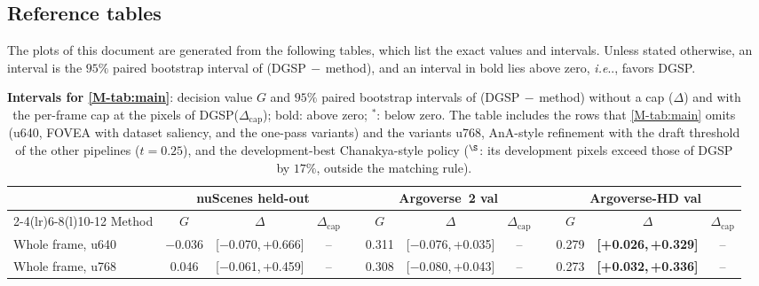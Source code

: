 \documentclass[10pt,letterpaper]{article}
\makeatletter
\DeclareRobustCommand\onedot{\futurelet\@let@token\@onedot}
\def\@onedot{\ifx\@let@token.\else.\null\fi\xspace}
\def\ie{\emph{i.e}\onedot} \def\Ie{\emph{I.e}\onedot}
\newcommand{\method}{DGSP\xspace}
\newcommand{\G}{G}
\newcommand{\ci}[2]{[#1,\allowbreak\,#2]}
\newcommand{\best}[1]{\textbf{#1}}
\newcommand{\na}{--}
\newcommand{\sw}{$^{\ast}$}   %
\theoremstyle{remark}
\theoremstyle{plain}
\theoremstyle{definition}
\makeatother
\begin{document}
\begin{landscape}
\section{Reference tables}
\label{sec:supp_reference}

The plots of this document are generated from the following tables, which list the exact values and intervals.
Unless stated otherwise, an interval is the $95\%$ paired bootstrap interval of (\method$\,-\,$method), and an interval in bold lies above zero, \ie, favors \method.

\begin{table}[!h]
\centering
\caption{\textbf{Intervals for \cref*{M-tab:main}}: decision value $\G$ and $95\%$ paired bootstrap intervals of (\method$\,-\,$method) without a cap ($\Delta$) and with the per-frame cap at the pixels of \method ($\Delta_{\mathrm{cap}}$); bold: above zero; \sw: below zero. The table includes the rows that \cref*{M-tab:main} omits (u640, FOVEA with dataset saliency, and the one-pass variants) and the variants u768, AnA-style refinement with the draft threshold of the other pipelines ($t=0.25$), and the development-best Chanakya-style policy ($^{\S}$: its development pixels exceed those of \method by $17\%$, outside the matching rule).}
\label{tab:main_ci}
\small
\setlength{\tabcolsep}{2.2pt}
\begin{tabular}{@{}lccccccccccc@{}}
\toprule
 & \multicolumn{3}{c}{nuScenes held-out} & & \multicolumn{3}{c}{Argoverse~2 val} & & \multicolumn{3}{c}{Argoverse-HD val} \\
\cmidrule(lr){2-4}\cmidrule(lr){6-8}\cmidrule(l){10-12}
Method & $\G$ & $\Delta$ & $\Delta_{\mathrm{cap}}$ & & $\G$ & $\Delta$ & $\Delta_{\mathrm{cap}}$ & & $\G$ & $\Delta$ & $\Delta_{\mathrm{cap}}$ \\
\midrule
Whole frame, u640 & $-$0.036 & \ci{$-$0.070}{+0.666} & \na &  & 0.311 & \ci{$-$0.076}{+0.035} & \na &  & 0.279 & \best{\ci{+0.026}{+0.329}} & \na \\
Whole frame, u768 & 0.046 & \ci{$-$0.061}{+0.459} & \na &  & 0.308 & \ci{$-$0.080}{+0.043} & \na &  & 0.273 & \best{\ci{+0.032}{+0.336}} & \na \\

\end{tabular}
\end{table}
\end{landscape}
\end{document}
